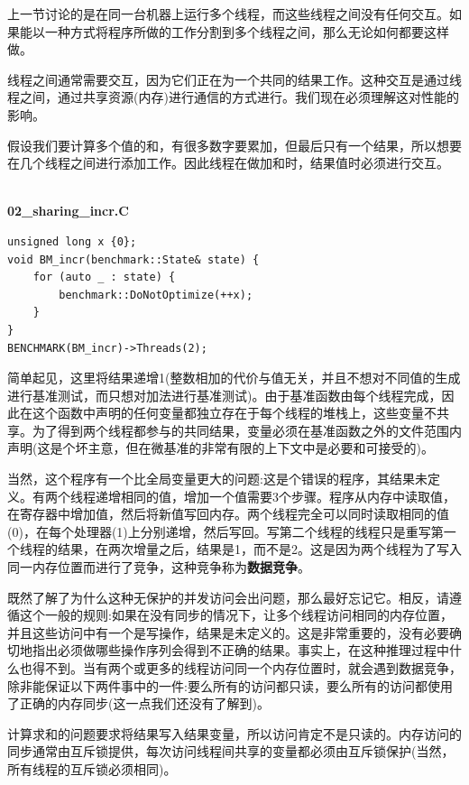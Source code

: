 上一节讨论的是在同一台机器上运行多个线程，而这些线程之间没有任何交互。如果能以一种方式将程序所做的工作分割到多个线程之间，那么无论如何都要这样做。

线程之间通常需要交互，因为它们正在为一个共同的结果工作。这种交互是通过线程之间，通过共享资源(内存)进行通信的方式进行。我们现在必须理解这对性能的影响。

假设我们要计算多个值的和，有很多数字要累加，但最后只有一个结果，所以想要在几个线程之间进行添加工作。因此线程在做加和时，结果值时必须进行交互。

\hspace*{\fill} \\ %
\noindent
\textbf{02\_sharing\_incr.C}
\begin{lstlisting}[style=styleCXX]
unsigned long x {0};
void BM_incr(benchmark::State& state) {
	for (auto _ : state) {
		benchmark::DoNotOptimize(++x);
	}
}
BENCHMARK(BM_incr)->Threads(2);
\end{lstlisting}

简单起见，这里将结果递增1(整数相加的代价与值无关，并且不想对不同值的生成进行基准测试，而只想对加法进行基准测试)。由于基准函数由每个线程完成，因此在这个函数中声明的任何变量都独立存在于每个线程的堆栈上，这些变量不共享。为了得到两个线程都参与的共同结果，变量必须在基准函数之外的文件范围内声明(这是个坏主意，但在微基准的非常有限的上下文中是必要和可接受的)。

当然，这个程序有一个比全局变量更大的问题:这是个错误的程序，其结果未定义。有两个线程递增相同的值，增加一个值需要3个步骤。程序从内存中读取值，在寄存器中增加值，然后将新值写回内存。两个线程完全可以同时读取相同的值(0)，在每个处理器(1)上分别递增，然后写回。写第二个线程的线程只是重写第一个线程的结果，在两次增量之后，结果是1，而不是2。这是因为两个线程为了写入同一内存位置而进行了竞争，这种竞争称为\textbf{数据竞争}。

既然了解了为什么这种无保护的并发访问会出问题，那么最好忘记它。相反，请遵循这个一般的规则:如果在没有同步的情况下，让多个线程访问相同的内存位置，并且这些访问中有一个是写操作，结果是未定义的。这是非常重要的，没有必要确切地指出必须做哪些操作序列会得到不正确的结果。事实上，在这种推理过程中什么也得不到。当有两个或更多的线程访问同一个内存位置时，就会遇到数据竞争，除非能保证以下两件事中的一件:要么所有的访问都只读，要么所有的访问都使用了正确的内存同步(这一点我们还没有了解到)。

计算求和的问题要求将结果写入结果变量，所以访问肯定不是只读的。内存访问的同步通常由互斥锁提供，每次访问线程间共享的变量都必须由互斥锁保护(当然，所有线程的互斥锁必须相同)。

